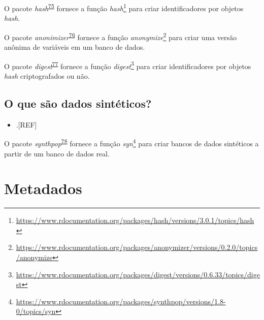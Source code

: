 \documentclass[
  a4paper,
]{book}
\providecommand{\tightlist}{%
  \setlength{\itemsep}{0pt}\setlength{\parskip}{0pt}}
\renewcommand{\href}[2]{#2\footnote{\url{#1}}}
\newenvironment{infobox}[1]
  {
  \begin{itemize}
  \renewcommand{\labelitemi}{
    \raisebox{-.7\height}[0pt][0pt]{
      {\setkeys{Gin}{width=3em,keepaspectratio}
        \texttt{[image: \#1]}}
    }
  }
  \setlength{\fboxsep}{1em}
  \begin{blackbox}
  \item
  }
  {
  \end{blackbox}
  \end{itemize}
  }
\begin{document}
\begin{infobox}{images/Rlogo}
O pacote \emph{hash}\textsuperscript{\protect\hyperlink{ref-hash}{75}} fornece a função \href{https://www.rdocumentation.org/packages/hash/versions/3.0.1/topics/hash}{\emph{hash}} para criar identificadores por objetos \emph{hash}.

\end{infobox}

\begin{infobox}{images/Rlogo}
O pacote \emph{anonimizer}\textsuperscript{\protect\hyperlink{ref-anonymizer}{76}} fornece a função \href{https://www.rdocumentation.org/packages/anonymizer/versions/0.2.0/topics/anonymize}{\emph{anonymize}} para criar uma versão anônima de variáveis em um banco de dados.

\end{infobox}

\begin{infobox}{images/Rlogo}
O pacote \emph{digest}\textsuperscript{\protect\hyperlink{ref-digest}{77}} fornece a função \href{https://www.rdocumentation.org/packages/digest/versions/0.6.33/topics/digest}{\emph{digest}} para criar identificadores por objetos \emph{hash} criptografados ou não.

\end{infobox}

\hypertarget{o-que-suxe3o-dados-sintuxe9ticos}{%
\subsection{O que são dados sintéticos?}\label{o-que-suxe3o-dados-sintuxe9ticos}}

\begin{itemize}
\tightlist
\item
  .{[}REF{]}
\end{itemize}

\begin{infobox}{images/Rlogo}
O pacote \emph{synthpop}\textsuperscript{\protect\hyperlink{ref-synthpop}{78}} fornece a função \href{https://www.rdocumentation.org/packages/synthpop/versions/1.8-0/topics/syn}{\emph{syn}} para criar bancos de dados sintéticos a partir de um banco de dados real.

\end{infobox}

\hypertarget{metadados}{%
\section{Metadados}\label{metadados}}
\end{document}
